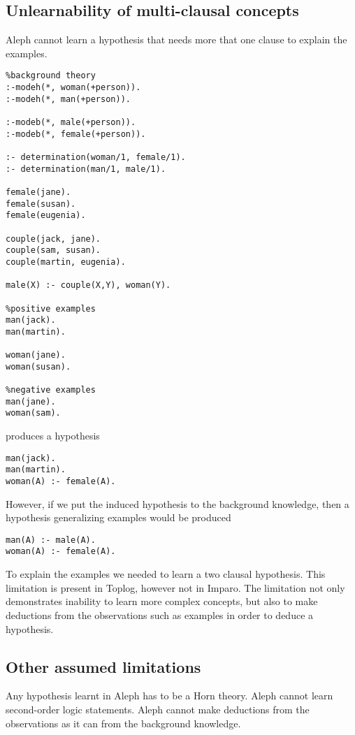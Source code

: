 \subsection{Unlearnability of multi-clausal concepts}
Aleph cannot learn a hypothesis that needs more that one clause to explain the examples.

\begin{lstlisting}
%background theory
:-modeh(*, woman(+person)).
:-modeh(*, man(+person)).

:-modeb(*, male(+person)).
:-modeb(*, female(+person)).

:- determination(woman/1, female/1).
:- determination(man/1, male/1).

female(jane).
female(susan).
female(eugenia).

couple(jack, jane).
couple(sam, susan).
couple(martin, eugenia).

male(X) :- couple(X,Y), woman(Y).

%positive examples
man(jack).
man(martin).

woman(jane).
woman(susan).

%negative examples
man(jane).
woman(sam).
\end{lstlisting}

produces a hypothesis
\begin{lstlisting}
man(jack).
man(martin).
woman(A) :- female(A).
\end{lstlisting}

However, if we put the induced hypothesis to the background knowledge, then a hypothesis generalizing  examples would be produced
\begin{lstlisting}
man(A) :- male(A).
woman(A) :- female(A).
\end{lstlisting}

To explain the  examples we needed to learn a two clausal hypothesis. This limitation is present in Toplog, however not in Imparo. The limitation not only demonstrates inability to learn more complex concepts, but also to make deductions from the observations such as  examples in order to deduce a hypothesis.

\subsection{Other assumed limitations}
Any hypothesis learnt in Aleph has to be a Horn theory. Aleph cannot learn second-order logic statements. Aleph cannot make deductions from the observations as it can from the background knowledge.


